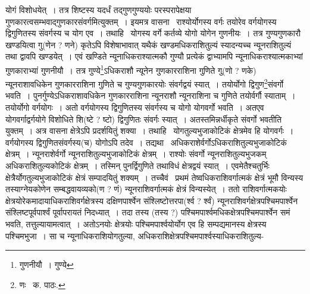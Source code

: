 \documentclass[11pt, openany]{book}
\begin{document}
\noindent योगं विशोधयेत्~। तत्र शिष्टस्य यदर्धं तद्गुणगुण्ययोः परस्परापेक्षया गुणकारत्वसम्भवाद्गुणकारसंवर्गमित्युक्तम्~। इयमत्र वासना \textendash\ राश्योर्योगस्य वर्गः तयोरेव वर्गयोगस्य द्विगुणितस्य संवर्गस्य च योग एव~। तथाहि \textendash\ योगस्य वर्गे कर्तव्ये योगो योगेन गुणनीयः~। तत्र गुण्यगुणकारौ खण्डयित्वा गु(णेन ? णने) कृतेऽपि विशेषाभावात् यथैकं खण्डमधिकराशितुल्यं स्यादन्यच्च न्यूनराशितुल्यं तथा द्वावपि खण्डयेत्~। एवं खण्डिते न्यूनाधिकराश्यात्मकौ गुण्यौ प्रत्येकं द्वाभ्यामपि न्यूनाधिकराश्यात्मकाभ्यां गुणकाराभ्यां गुणनीयौ~। तत्र गुण्ये\renewcommand{\thefootnote}{१}\footnote{गुणनीयौ~। गुण्ये}ऽधिकराशौ न्यूनेन गुणकारराशिना गुणिते गु(णो ? णके) न्यूनराशावधिकेन गुणकारराशिना गुणिते च गुण्यगुणकारयोः संवर्गद्वयं स्यात्~। तयोर्योगो द्विगुण\renewcommand{\thefootnote}{१}\footnote{णः \textendash\ क. पाठः.}संवर्गो भवति~। पुनर्गुण्येऽधिकराशावधिकेन गुणकारराशिना न्यूनराशौ न्यूनराशिना च गुणिते तयोर्वर्गौ स्याताम्~। तयोर्योगो वर्गयोगः~। अतो वर्गयोगस्य द्विगुणितस्य संवर्गस्य च योगो योगवर्गो भवति~। अतएव योगवर्गाद्वर्गयोगे विशोधिते शि(ष्टे ? ष्टो) द्विगुणितः संवर्गः स्यात्~। अतस्तमिन्नर्धीकृते संवर्गो भवतीति युक्तम्~। अत्र वासना क्षेत्रेऽपि प्रदर्शयितुं शक्या~। तथाहि \textendash\ योगतुल्यभुजाकोटिकं क्षेत्रमेव हि योगवर्गः~। वर्गयोगस्य द्विगुणितसंवर्गस्य(च) योगोऽपि तदेव~। तद्यथा \textendash\ अधिकराशेर्वर्गोऽधिकराशितुल्यभुजाकोटिकं क्षेत्रम्~। न्यूनराशेर्वर्गो न्यूनराशितुल्यभुजाकोटिकं क्षेत्रम्~। राश्योः संवर्गो न्यूनराशितुल्यभुजकम् अधिकराशितुल्यकोटिकं क्षेत्रम्~। तस्मिन् पुनर्द्विगुणिते तथाविधं क्षेत्रद्वयं स्यात्~। एवमेतैश्चतुर्भिः क्षेत्रैर्योगतुल्यभुजाकोटिकं क्षेत्रं सम्पादयितुं शक्यम्~। तच्चैवं \textendash\ प्रथमं तेष्वधिकराशिवर्गात्मकं क्षेत्रं भूमौ विन्यस्य तस्याग्नेयकोणेन सम्बद्धवायव्यको(ण ? णं) न्यूनराशिवर्गात्मकं क्षेत्रं विन्यस्येत्~। ततो राशिवर्गात्मकयोः क्षेत्रयोरेकमादायाधिकराशिवर्गक्षेत्रस्य दक्षिणपार्श्वेन संश्लिष्टोत्तरपा(र्श्व ? र्श्वं) न्यूनराशिवर्गक्षेत्रपश्चिमपार्श्वेन संश्लिष्टपूर्वपार्श्वं पूर्वापरायतं निदध्यात्~। तदा तस्य (तस्य ?) पश्चिमपार्श्वमधिकक्षेत्रपश्चिमपार्श्वेन समं भवति, तत्तुल्यायामत्वात्~। अतोऽनयोः क्षेत्रयोः पश्चिमपार्श्वयोर्योग एव हि सम्पद्यमानस्य क्षेत्रस्य पश्चिमभुजा~। सा च न्यूनाधिकराशियोगतुल्या, अधिकराशिक्षेत्रपश्चिमपार्श्वस्याधिकराशितुल्य-

\newpage
\end{document}
